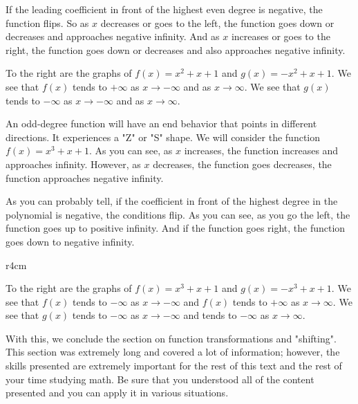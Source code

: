 \documentclass[lang=en,11pt]{elegantbook}
\begin{document}
If the leading coefficient in front of the highest even degree is negative, the function flips.  So as $x$ decreases or goes to the left, the function goes down or decreases and approaches negative infinity.  And as $x$ increases or goes to the right, the function goes down or decreases and also approaches negative infinity.

To the right are the graphs of $f(x)=x^2+x+1$ and $g(x)=-x^2+x+1$.  We see that $f(x)$ tends to $+\infty$ as $x\to-\infty$ and as $x\to\infty$.  We see that $g(x)$ tends to $-\infty$ as $x\to-\infty$ and as $x\to\infty$.

An odd-degree function will have an end behavior that points in different directions.  It experiences a "Z" or "S" shape.  We will consider the function $f(x)=x^3+x+1$.  As you can see, as $x$ increases, the function increases and approaches infinity.  However, as $x$ decreases, the function goes decreases, the function approaches negative infinity.  

As you can probably tell, if the coefficient in front of the highest degree in the polynomial is negative, the conditions flip.  As you can see, as you go the left, the function goes up to positive infinity.  And if the function goes right, the function goes down to negative infinity.  

\begin{wrapfigure}{r}{4cm}
    \centering
\end{wrapfigure}

To the right are the graphs of $f(x)=x^3+x+1$ and $g(x)=-x^3+x+1$.  We see that $f(x)$ tends to $-\infty$ as $x\to-\infty$ and $f(x)$ tends to $+\infty$ as $x\to\infty$.  We see that $g(x)$ tends to $-\infty$ as $x\to-\infty$ and tends to $-\infty$ as $x\to\infty$.

With this, we conclude the section on function transformations and "shifting".  This section was extremely long and covered a lot of information; however, the skills presented are extremely important for the rest of this text and the rest of your time studying math.  Be sure that you understood all of the content presented and you can apply it in various situations.
\end{document}
